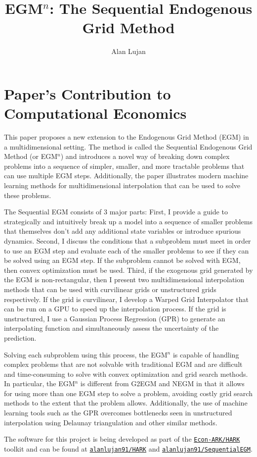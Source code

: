 \documentclass[SequentialEGM]{subfiles}
\title{\Large EGM$^n$: The Sequential Endogenous Grid Method}
\author{Alan Lujan\authNum}
\begin{document}
\maketitle

\begin{authorsinfo}
    \noindent {}
\end{authorsinfo}

\section{Paper's Contribution to Computational Economics}

This paper proposes a new extension to the Endogenous Grid Method (EGM) in a multidimensional setting. The method is called the Sequential Endogenous Grid Method (or EGM$^n$) and introduces a novel way of breaking down complex problems into a sequence of simpler, smaller, and more tractable problems that can use multiple EGM steps. Additionally, the paper illustrates modern machine learning methods for multidimensional interpolation that can be used to solve these problems.

The Sequential EGM consists of 3 major parts: First, I provide a guide to strategically and intuitively break up a model into a sequence of smaller problems that themselves don't add any additional state variables or introduce spurious dynamics. Second, I discuss the conditions that a subproblem must meet in order to use an EGM step and evaluate each of the smaller problems to see if they can be solved using an EGM step. If the subproblem cannot be solved with EGM, then convex optimization must be used. Third, if the exogenous grid generated by the EGM is non-rectangular, then I present two multidimensional interpolation methods that can be used with curvilinear grids or unstructured grids respectively. If the grid is curvilinear, I develop a Warped Grid Interpolator that can be run on a GPU to speed up the interpolation process. If the grid is unstructured, I use a Gaussian Process Regression (GPR) to generate an interpolating function and simultaneously assess the uncertainty of the prediction.

Solving each subproblem using this process, the EGM$^n$ is capable of handling complex problems that are not solvable with traditional EGM and are difficult and time-consuming to solve with convex optimization and grid search methods. In particular, the EGM$^n$ is different from G2EGM and NEGM in that it allows for using more than one EGM step to solve a problem, avoiding costly grid search methods to the extent that the problem allows. Additionally, the use of machine learning tools such as the GPR overcomes bottlenecks seen in unstructured interpolation using Delaunay triangulation and other similar methods.

The software for this project is being developed as part of the \href{https://github.com/econ-ark/HARK}{\texttt{Econ-ARK/HARK}} toolkit and can be found at \href{https://github.com/alanlujan91/HARK/tree/map_coordinates}{\texttt{alanlujan91/HARK}} and \href{https://github.com/alanlujan91/SequentialEGM}{\texttt{alanlujan91/SequentialEGM}}.
\end{document}

